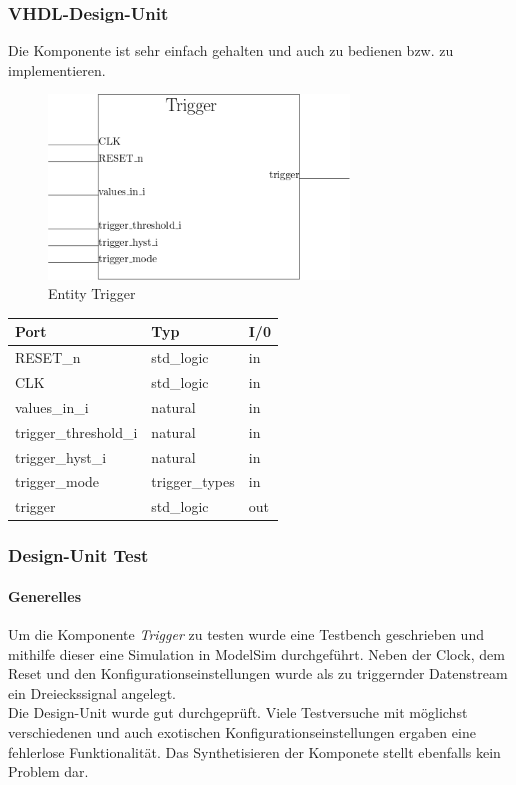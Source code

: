 \subsubsection{VHDL-Design-Unit}
Die Komponente ist sehr einfach gehalten und auch zu bedienen bzw. zu implementieren.

\begin{figure}[h]
	\begin{center}
		\includegraphics[width=8cm]{SAUER/Grafiken/Trigger/Block.png}
		\caption{Entity Trigger}
	\end{center}
\end{figure}
\begin{center}
\begin{tabular}[h]{|l|l|l|}
	\hline
	Port & Typ & I/0\\
	\hline\hline
	RESET\_n & std\_logic & in\\
	\hline
	CLK & std\_logic & in\\
	\hline
	values\_in\_i & natural & in\\
	\hline
	trigger\_threshold\_i & natural & in\\
	\hline
	trigger\_hyst\_i & natural & in\\
	\hline
	trigger\_mode & trigger\_types & in\\
	\hline
	trigger & std\_logic & out\\
	\hline
\end{tabular}
\end{center}
\subsubsection{Design-Unit Test}
\paragraph{Generelles}
Um die Komponente \textit{Trigger} zu testen wurde eine Testbench geschrieben und mithilfe dieser eine Simulation in ModelSim durchgeführt. Neben der Clock, dem Reset und den Konfigurationseinstellungen wurde als zu triggernder Datenstream ein Dreieckssignal angelegt.
\\Die Design-Unit wurde gut durchgeprüft. Viele Testversuche mit möglichst verschiedenen und auch exotischen Konfigurationseinstellungen ergaben eine fehlerlose Funktionalität. Das Synthetisieren der Komponete stellt ebenfalls kein Problem dar.

